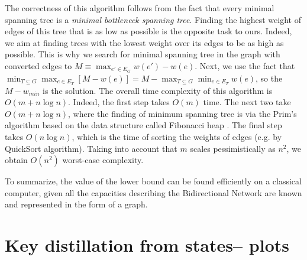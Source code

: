 \documentclass[aps,pra,twocolumn,superscriptaddress,longbibliography]{revtex4-1}
\begin{document}
\begin{appendix}
The correctness of this algorithm follows
from the fact that every minimal spanning tree is a {\it minimal bottleneck spanning tree}. Finding the highest weight of edges of this tree that is as low as possible is the opposite task to ours. Indeed, we aim
at finding trees with the lowest weight
over its edges to be as high as possible.
This is why we search for minimal spanning tree in the graph with converted edges 
to $M\equiv \max_{e'\in E_G} w(e') - w(e)$.
Next, we use the fact that $\min_{T\subseteq G} \max_{e \in E_T} [M- w(e)] = 
M- \max_{T\subseteq G} \min_{e \in E_T} w(e)$, so the $M- w_{min}$ is the solution.
The overall time complexity of this algorithm is $O(m + n\log n)$. Indeed, the first step takes $O(m)$ time. The next two
take $O(m +n\log n)$, where the finding
of minimum spanning tree is via the Prim's algorithm based on the data structure called Fibonacci heap \cite{LRCSbook}. The final step takes $O(n\log n)$, which is the time of sorting the weights of edges (e.g. by QuickSort algorithm). Taking into account
that $m$ scales pessimistically as $n^2$,
we obtain $O(n^2)$ worst-case complexity.



To summarize, the value of the lower bound can be found efficiently on a classical computer, given all the
capacities describing the Bidirectional Network are known and represented in the form of a graph.


\section{Key distillation from states-- plots}\label{app:StatesPlots}
\iffalse

\end{appendix}
\end{document}
